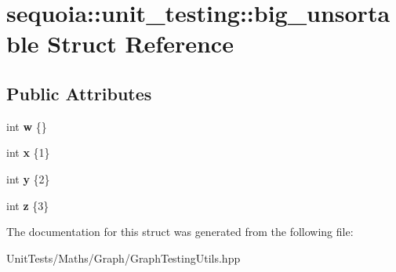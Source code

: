 \hypertarget{structsequoia_1_1unit__testing_1_1big__unsortable}{}\section{sequoia\+::unit\+\_\+testing\+::big\+\_\+unsortable Struct Reference}
\label{structsequoia_1_1unit__testing_1_1big__unsortable}
\subsection*{Public Attributes}
\begin{DoxyCompactItemize}
\item 
\mbox{\label{structsequoia_1_1unit__testing_1_1big__unsortable_a49d2c10fc733198c0aa36c4e69aed515}} 
int {\bfseries w} \{\}
\item 
\mbox{\label{structsequoia_1_1unit__testing_1_1big__unsortable_ad7f55d63e158f048265cacdbd5a3d3ee}} 
int {\bfseries x} \{1\}
\item 
\mbox{\label{structsequoia_1_1unit__testing_1_1big__unsortable_a28cf81b8ba576e34239d4a20f1435c02}} 
int {\bfseries y} \{2\}
\item 
\mbox{\label{structsequoia_1_1unit__testing_1_1big__unsortable_aaf2f9dba955b57699cc4414630e5c37c}} 
int {\bfseries z} \{3\}
\end{DoxyCompactItemize}


The documentation for this struct was generated from the following file\+:\begin{DoxyCompactItemize}
\item 
Unit\+Tests/\+Maths/\+Graph/Graph\+Testing\+Utils.\+hpp\end{DoxyCompactItemize}
